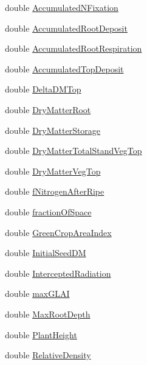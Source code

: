 \begin{DoxyCompactItemize}
double \hyperlink{classcrop_parameters_crop_a087bd1aae026a0d5af089949ff802a78}{AccumulatedNFixation}
\item 
double \hyperlink{classcrop_parameters_crop_a6b693abfa46e76c0263c9af66b825608}{AccumulatedRootDeposit}
\item 
double \hyperlink{classcrop_parameters_crop_a66dd995ccdbdf655e7f05c042fd2425d}{AccumulatedRootRespiration}
\item 
double \hyperlink{classcrop_parameters_crop_aef7daaa20fab37781b2c9dd3af8b3719}{AccumulatedTopDeposit}
\item 
double \hyperlink{classcrop_parameters_crop_a8de1318264dd7d9e6c57f3eca9c5a839}{DeltaDMTop}
\item 
double \hyperlink{classcrop_parameters_crop_a9a309c8343b6202ca7e4f463cd2001b0}{DryMatterRoot}
\item 
double \hyperlink{classcrop_parameters_crop_aff0c3e5f1b15d1ae41a268c2f8a669cd}{DryMatterStorage}
\item 
double \hyperlink{classcrop_parameters_crop_aa1e7fde96c3abffb799b5827d693ca62}{DryMatterTotalStandVegTop}
\item 
double \hyperlink{classcrop_parameters_crop_ad9864a8d4f743c058860bffe0e4a0d55}{DryMatterVegTop}
\item 
double \hyperlink{classcrop_parameters_crop_aec64de62687012f6d29b5758c42bc243}{fNitrogenAfterRipe}
\item 
double \hyperlink{classcrop_parameters_crop_a87ff71153d8a56b21411c59634519437}{fractionOfSpace}
\item 
double \hyperlink{classcrop_parameters_crop_a9bd08d857779568989fef52ec29c4dc3}{GreenCropAreaIndex}
\item 
double \hyperlink{classcrop_parameters_crop_a07b5e4cd4b704e9f525c4c7c8ff3dd10}{InitialSeedDM}
\item 
double \hyperlink{classcrop_parameters_crop_a7f46744dd58b0a19cd5f36dba07883b3}{InterceptedRadiation}
\item 
double \hyperlink{classcrop_parameters_crop_a0bc009a6c4c94105f1ff436a0035abb5}{maxGLAI}
\item 
double \hyperlink{classcrop_parameters_crop_a962a96eb6618d746f00443bb4ac2993c}{MaxRootDepth}
\item 
double \hyperlink{classcrop_parameters_crop_a0c60931aab2f092d142e32c97e8d4de8}{PlantHeight}
\item 
double \hyperlink{classcrop_parameters_crop_ad75224873989030437acb983d4971616}{RelativeDensity}
\item 

\end{DoxyCompactItemize}
